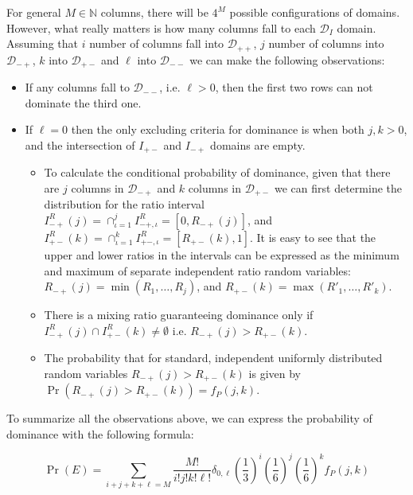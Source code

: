 \documentclass{article}
\theoremstyle{definition}
\begin{document}
\begin{appendices}
For general $M \in \mathbb{N}$ columns, there will be $4^M$ possible configurations of domains.
However, what really matters is how many columns fall to each $\mathcal{D}_I$ domain.
Assuming that $i$ number of columns fall into $\mathcal{D}_{++}$, $j$ number of columns into $\mathcal{D}_{-+}$, $k$ into $\mathcal{D}_{+-}$ and $\ell$ into $\mathcal{D}_{--}$ we can make the following observations:

\begin{itemize}
    \item If any columns fall to $\mathcal{D}_{--}$, i.e. $\ell > 0$, then the first two rows can not dominate the third one.
    \item If $\ell=0$ then the only excluding criteria for dominance is when both $j,k>0$, and the intersection of $I_{+-}$ and $I_{-+}$ domains are empty.
    \begin{itemize}
        \item To calculate the conditional probability of dominance, given that there are $j$ columns in $\mathcal{D}_{-+}$ and $k$ columns in $\mathcal{D}_{+-}$ we can first determine the distribution for the ratio interval $I^R_{-+}(j) = \cap_{\iota=1}^j I^R_{-+,\iota} = [0, R_{-+}(j)]$,
        and $I^R_{+-}(k) = \cap_{\iota=1}^k I^R_{+-,\iota} = [R_{+-}(k),1]$.
        It is easy to see that the upper and lower ratios in the intervals can be expressed as the minimum and maximum of separate independent ratio random variables:
        $R_{-+}(j)= \min(R_1,\dots,R_j)$, and $R_{+-}(k)= \max(R'_1,\dots,R'_k)$.
        \item There is a mixing ratio guaranteeing dominance only if $I^R_{-+}(j) \cap I^R_{+-}(k) \ne \emptyset$ i.e. $R_{-+}(j) > R_{+-}(k)$.
        \item The probability that for standard, independent uniformly distributed random variables $R_{-+}(j) > R_{+-}(k)$ is given by $\Pr(R_{-+}(j) > R_{+-}(k)) = f_P(j,k)$.
    \end{itemize}
\end{itemize}

To summarize all the observations above, we can express the probability of dominance with the following formula:

\begin{equation}
    \Pr(E)
    =
    \sum_{i+j+k+\ell=M} \frac{M!}{i!j!k!\ell!}
    \delta_{0,\ell}
    \left(\frac{1}{3}\right)^i
    \left(\frac{1}{6}\right)^j
    \left(\frac{1}{6}\right)^k 
    f_P(j,k)
\end{equation}


\end{appendices}
\end{document}
